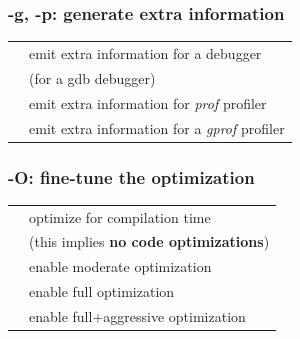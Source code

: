 \documentclass[aspectratio=169]{beamer}
\begin{document}
\begin{frame}
\frametitle{-g, -p: generate extra information}
\begin{table}
\begin{tabular}{l l}
\toprule
\texttt{\color{clFlag}{-g}} & emit extra information for a debugger\\ [3ex]
\texttt{\color{clFlag}{-ggdb}} & (for a gdb debugger)\\ [3ex]
\texttt{\color{clFlag}{-p}} & emit extra information for \textit{prof} profiler\\ [3ex]
\texttt{\color{clFlag}{-pg}} & emit extra information for a \textit{gprof} profiler\\ [3ex]
\bottomrule
\end{tabular}
\end{table}
\end{frame}


\begin{frame}
\frametitle{-O: fine-tune the optimization}
\begin{table}
\begin{tabular}{l l}
\toprule
\texttt{\color{clFlag}{-O0}} &
    optimize for compilation time \\[1ex]
    & (this implies \textbf{no code optimizations})\\ [2ex]
\texttt{\color{clFlag}{-O1}} & enable moderate optimization \\ [3ex]
\texttt{\color{clFlag}{-O2}} & enable full optimization\\ [3ex]
\texttt{\color{clFlag}{-O3}} & enable full+aggressive optimization\\ [3ex]
\bottomrule
\end{tabular}
\end{table}
\end{frame}
\end{document}
